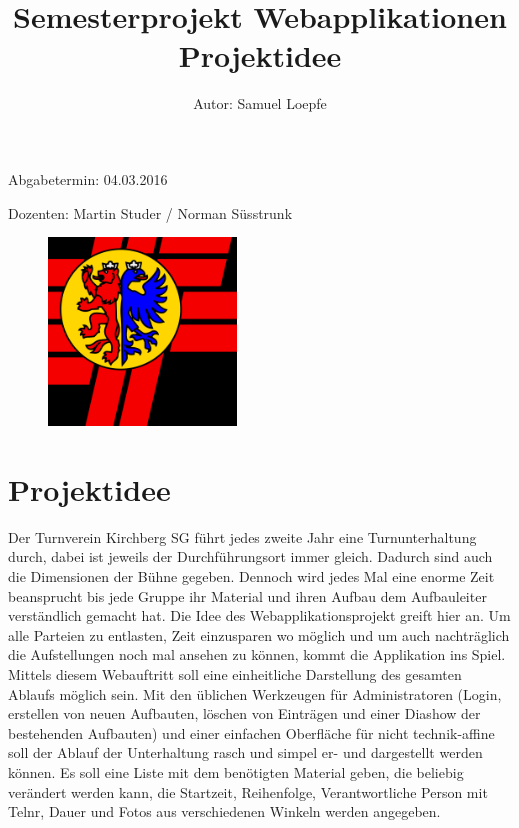 \documentclass[12pt, a4paper]{article}
\begin{document}
\title{Semesterprojekt Webapplikationen \break  Projektidee}
\maketitle
\bigskip
\hspace{4cm} \author{Autor: Samuel Loepfe}

\hspace {4cm} Abgabetermin: 04.03.2016											%

\hspace{4cm} Dozenten:  Martin Studer / Norman Süsstrunk


\vspace{6cm}
\begin{figure}[h]
\hspace{6cm}
\includegraphics[keepaspectratio, width=5cm]{pictures/stvk_logo}

\end{figure}




\newpage																		%
\newpage
\newpage																		%

\section{Projektidee}
Der Turnverein Kirchberg SG führt jedes zweite Jahr eine Turnunterhaltung durch, dabei ist jeweils der Durchführungsort immer gleich. Dadurch sind auch die Dimensionen der Bühne gegeben. Dennoch wird jedes Mal eine enorme Zeit beansprucht bis jede Gruppe ihr Material und ihren Aufbau dem Aufbauleiter verständlich gemacht hat. Die Idee des Webapplikationsprojekt greift hier an. Um alle Parteien zu entlasten, Zeit einzusparen wo möglich und um auch nachträglich die Aufstellungen noch mal ansehen zu können, kommt die Applikation ins Spiel. Mittels diesem Webauftritt soll eine einheitliche Darstellung des gesamten Ablaufs möglich sein. Mit den üblichen Werkzeugen für Administratoren (Login, erstellen von neuen Aufbauten, löschen von Einträgen und einer Diashow der bestehenden Aufbauten) und einer einfachen Oberfläche für nicht technik-affine soll der Ablauf der Unterhaltung rasch und simpel er- und dargestellt werden können.
Es soll eine Liste mit dem benötigten Material geben, die beliebig verändert werden kann, die Startzeit, Reihenfolge, Verantwortliche Person mit Telnr, Dauer und Fotos aus verschiedenen Winkeln werden angegeben. 
 
\end{document}
